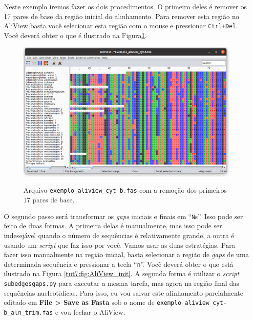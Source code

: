 \begin{refsection}
Neste exemplo iremos fazer os dois procedimentos. O primeiro deles é remover os 17 pares de base da região inicial do alinhamento. Para remover esta região no AliView basta você selecionar esta região com o mouse e pressionar \texttt{Ctrl+Del}. Você deverá obter o que é ilustrado na Figura\ref{tut7:fig:AliView_trimmed}.


  \begin{figure}[H]
       \centering
      {\includegraphics[scale=0.4]{figures/tut7/aliview_04.png}}
	{\caption[AliView: remoção da região inicial]{Arquivo \texttt{exemplo\_aliview\_cyt-b.fas} com a remoção dos primeiros 17 pares de base.}\label{tut7:fig:AliView_trimmed}}
  \end{figure}


O segundo passo será transformar os \textit{gaps} iniciais e finais em ``\texttt{N}s''. Isso pode ser feito de duas formas. A primeira delas é manualmente, mas isso pode ser indesejável quando o número de sequências é relativamente grande, a outra é usando um \textit{script} que faz isso por você. Vamos usar as duas estratégias. Para fazer isso manualmente na região inicial, basta selecionar a região de \textit{gaps} de uma determinada sequência e pressionar a tecla ``\texttt{n}''. Você deverá obter o que está ilustrado na Figura \ref{tut7:fig:AliView_init}. A segunda forma é utilizar o \textit{script} \texttt{subedgesgaps.py} para executar a mesma tarefa, mas agora na região final das sequências nucleotídicas. Para isso, eu vou salvar este alinhamento parcialmente editado em \textbf{File > Save as Fasta} sob o nome de \texttt{exemplo\_aliview\_cyt-b\_aln\_trim.fas} e vou fechar o AliView.



\end{refsection}
